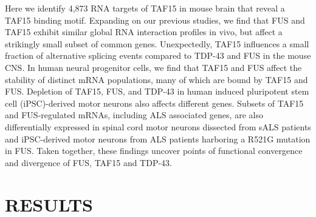 Here we identify 4,873 RNA targets of TAF15 in mouse brain that reveal a TAF15 binding motif. Expanding on our previous studies\cite{Lagier-Tourenne2012,Polymenidou2011}, we find that FUS and TAF15 exhibit similar global RNA interaction profiles in vivo, but affect a strikingly small subset of common genes. Unexpectedly, TAF15 influences a small fraction of alternative splicing events compared to TDP-43 and FUS in the mouse CNS. In human neural progenitor cells, we find that TAF15 and FUS affect the stability of distinct mRNA populations, many of which are bound by TAF15 and FUS. Depletion of TAF15, FUS, and TDP-43 in human induced pluripotent stem cell (iPSC)-derived motor neurons also affects different genes. Subsets of TAF15 and FUS-regulated mRNAs, including ALS associated genes, are also differentially expressed in spinal cord motor neurons dissected from sALS patients and iPSC-derived motor neurons from ALS patients harboring a R521G mutation in FUS. Taken together, these findings uncover points of functional convergence and divergence of FUS, TAF15 and TDP-43.
 
\section{RESULTS}

